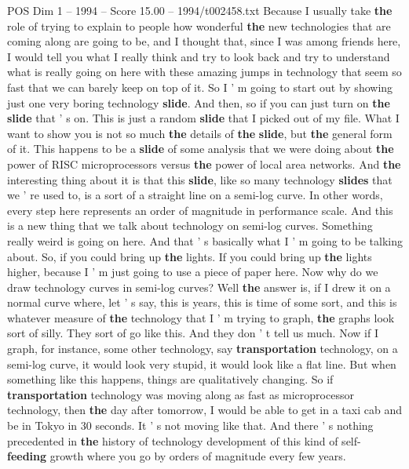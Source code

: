 \begin{textsample}{POS Dim 1 – 1994 – Score 15.00 – 1994/t002458.txt}  \label{ex:f1_pos_001}
Because I usually take \textbf{the} role of trying to explain to people how wonderful \textbf{the} new technologies that are coming along are going to be, and I thought that, since I was among friends here, I would tell you what I really think and try to look back and try to understand what is really going on here with these amazing jumps in technology that seem so fast that we can barely keep on top of it.
So I ' m going to start out by showing just one very boring technology \textbf{slide}.
And then, so if you can just turn on \textbf{the} \textbf{slide} that ' s on.
This is just a random \textbf{slide} that I picked out of my file.
What I want to show you is not so much \textbf{the} details of \textbf{the} \textbf{slide}, but \textbf{the} general form of it.
This happens to be a \textbf{slide} of some analysis that we were doing about \textbf{the} power of RISC microprocessors versus \textbf{the} power of local area networks.
And \textbf{the} interesting thing about it is that this \textbf{slide}, like so many technology \textbf{slides} that we ' re used to, is a sort of a straight line on a semi-log curve.
In other words, every step here represents an order of magnitude in performance scale.
And this is a new thing that we talk about technology on semi-log curves.
Something really weird is going on here.
And that ' s basically what I ' m going to be talking about.
So, if you could bring up \textbf{the} lights.
If you could bring up \textbf{the} lights higher, because I ' m just going to use a piece of paper here.
Now why do we draw technology curves in semi-log curves?
Well \textbf{the} answer is, if I drew it on a normal curve where, let ' s say, this is years, this is time of some sort, and this is whatever measure of \textbf{the} technology that I ' m trying to graph, \textbf{the} graphs look sort of silly.
They sort of go like this.
And they don ' t tell us much.
Now if I graph, for instance, some other technology, say \textbf{transportation} technology, on a semi-log curve, it would look very stupid, it would look like a flat line.
But when something like this happens, things are qualitatively changing.
So if \textbf{transportation} technology was moving along as fast as microprocessor technology, then \textbf{the} day after tomorrow, I would be able to get in a taxi cab and be in Tokyo in 30 seconds.
It ' s not moving like that.
And there ' s nothing precedented in \textbf{the} history of technology development of this kind of self- \textbf{feeding} growth where you go by orders of magnitude every few years.

\end{textsample}
